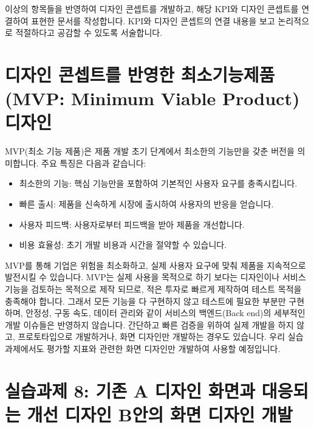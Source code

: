 \documentclass[
  letterpaper,
]{book}
\providecommand{\tightlist}{%
  \setlength{\itemsep}{0pt}\setlength{\parskip}{0pt}}\usepackage{longtable,booktabs,array}
\begin{document}
이상의 항목들을 반영하여 디자인 콘셉트를 개발하고, 해당 KPI와 디자인
콘셉트를 연결하여 표현한 문서를 작성합니다. KPI와 디자인 콘셉트의 연결
내용을 보고 논리적으로 적절하다고 공감할 수 있도록 서술합니다.

\section{디자인 콘셉트를 반영한 최소기능제품(MVP: Minimum Viable
Product)
디자인}\label{uxb514uxc790uxc778-uxcf58uxc149uxd2b8uxb97c-uxbc18uxc601uxd55c-uxcd5cuxc18cuxae30uxb2a5uxc81cuxd488mvp-minimum-viable-product-uxb514uxc790uxc778}

MVP(최소 기능 제품)은 제품 개발 초기 단계에서 최소한의 기능만을 갖춘
버전을 의미합니다. 주요 특징은 다음과 같습니다:

\begin{itemize}
\tightlist
\item
  최소한의 기능: 핵심 기능만을 포함하여 기본적인 사용자 요구를
  충족시킵니다.
\item
  빠른 출시: 제품을 신속하게 시장에 출시하여 사용자의 반응을 얻습니다.
\item
  사용자 피드백: 사용자로부터 피드백을 받아 제품을 개선합니다.
\item
  비용 효율성: 초기 개발 비용과 시간을 절약할 수 있습니다.
\end{itemize}

MVP를 통해 기업은 위험을 최소화하고, 실제 사용자 요구에 맞춰 제품을
지속적으로 발전시킬 수 있습니다. MVP는 실제 사용을 목적으로 하기 보다는
디자인이나 서비스 기능을 검토하는 목적으로 제작 되므로, 적은 투자로
빠르게 제작하여 테스트 목적을 충족해야 합니다. 그래서 모든 기능을 다
구현하지 않고 테스트에 필요한 부분만 구현하며, 안정성, 구동 속도, 데이터
관리와 같이 서비스의 백엔드(Back end)의 세부적인 개발 이슈들은 반영하지
않습니다. 간단하고 빠른 검증을 위하여 실제 개발을 하지 않고,
프로토타입으로 개발하거나, 화면 디자인만 개발하는 경우도 있습니다. 우리
실습 과제에서도 평가할 지표와 관련한 화면 디자인만 개발하여 사용할
예정입니다.

\section{실습과제 8: 기존 A 디자인 화면과 대응되는 개선 디자인 B안의
화면 디자인
개발}\label{uxc2e4uxc2b5uxacfcuxc81c-8-uxae30uxc874-a-uxb514uxc790uxc778-uxd654uxba74uxacfc-uxb300uxc751uxb418uxb294-uxac1cuxc120-uxb514uxc790uxc778-buxc548uxc758-uxd654uxba74-uxb514uxc790uxc778-uxac1cuxbc1c}
\end{document}
